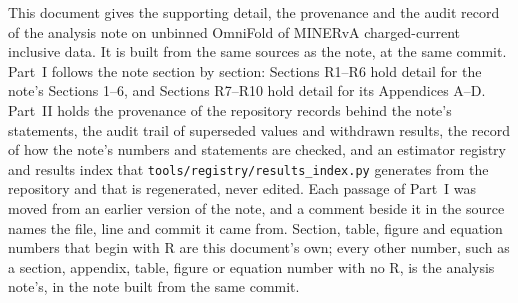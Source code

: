 \noindent This document gives the supporting detail, the provenance and the audit record of the analysis note on unbinned OmniFold of MINERvA charged-current inclusive data.
It is built from the same sources as the note, at the same commit.
Part~I follows the note section by section: Sections R1--R6 hold detail for the note's Sections 1--6, and Sections R7--R10 hold detail for its Appendices A--D.
Part~II holds the provenance of the repository records behind the note's statements, the audit trail of superseded values and withdrawn results, the record of how the note's numbers and statements are checked, and an estimator registry and results index that \texttt{tools/registry/results\_index.py} generates from the repository and that is regenerated, never edited.
Each passage of Part~I was moved from an earlier version of the note, and a comment beside it in the source names the file, line and commit it came from.
Section, table, figure and equation numbers that begin with R are this document's own; every other number, such as a section, appendix, table, figure or equation number with no R, is the analysis note's, in the note built from the same commit.
